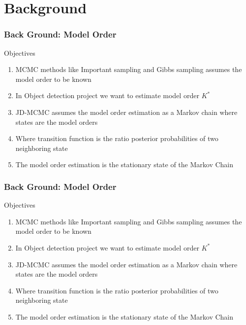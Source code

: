 \documentclass[11pt]{beamer}
\begin{document}
\section{Background}
\begin{frame}
\frametitle{Back Ground: Model Order}
	\begin{block}{Objectives}
	\begin{enumerate}
		\item MCMC methods like Important sampling and Gibbs sampling assumes the model order to be known
    	\item In Object detection project we want to estimate model order $K^*$
		\item JD-MCMC assumes the model order estimation as a Markov chain where states are the model orders
		\item Where transition function is the ratio posterior probabilities of two neighboring state
		\item The model order estimation is the stationary state of the Markov Chain
	\end{enumerate}
	\end{block}
\end{frame}

\begin{frame}
\frametitle{Back Ground: Model Order}
	\begin{block}{Objectives}
	\begin{enumerate}
		\item MCMC methods like Important sampling and Gibbs sampling assumes the model order to be known
    	\item In Object detection project we want to estimate model order $K^*$
		\item JD-MCMC assumes the model order estimation as a Markov chain where states are the model orders
		\item Where transition function is the ratio posterior probabilities of two neighboring state
		\item The model order estimation is the stationary state of the Markov Chain
	\end{enumerate}
	\end{block}
\end{frame}
\end{document}
